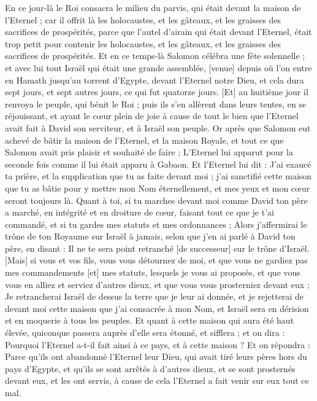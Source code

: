 \begin{multicols}{2}
En ce jour-là le Roi consacra le milieu du parvis, qui était devant la maison de l'Eternel ; car il offrit là les holocaustes, et les gâteaux, et les graisses des sacrifices de prospérités, parce que l'autel d'airain qui était devant l'Eternel, était trop petit pour contenir les holocaustes, et les gâteaux, et les graisses des sacrifices de prospérités.
Et en ce temps-là Salomon célébra une fête solennelle ; et avec lui tout Israël qui était une grande assemblée, [venue] depuis où l'on entre en Hamath jusqu'au torrent d'Egypte, devant l'Eternel notre Dieu, et cela dura sept jours, et sept autres jours, ce qui fut quatorze jours.
[Et] au huitième jour il renvoya le peuple, qui bénit le Roi ; puis ils s'en allèrent dans leurs tentes, en se réjouissant, et ayant le cœur plein de joie à cause de tout le bien que l'Eternel avait fait à David son serviteur, et à Israël son peuple.
\VerseOne{}Or après que Salomon eut achevé de bâtir la maison de l'Eternel, et la maison Royale, et tout ce que Salomon avait pris plaisir et souhaité de faire ;
L'Eternel lui apparut pour la seconde fois comme il lui était apparu à Gabaon.
Et l'Eternel lui dit : J'ai exaucé ta prière, et la supplication que tu as faite devant moi ; j'ai sanctifié cette maison que tu as bâtie pour y mettre mon Nom éternellement, et mes yeux et mon cœur seront toujours là.
Quant à toi, si tu marches devant moi comme David ton père a marché, en intégrité et en droiture de cœur, faisant tout ce que je t'ai commandé, et si tu gardes mes statuts et mes ordonnances ;
Alors j'affermirai le trône de ton Royaume sur Israël à jamais, selon que j'en ai parlé à David ton père, en disant : Il ne te sera point retranché [de successeur] sur le trône d'Israël.
[Mais] si vous et vos fils, vous vous détournez de moi, et que vous ne gardiez pas mes commandements [et] mes statuts, lesquels je vous ai proposés, et que vous vous en alliez et serviez d'autres dieux, et que vous vous prosterniez devant eux ;
Je retrancherai Israël de dessus la terre que je leur ai donnée, et je rejetterai de devant moi cette maison que j'ai consacrée à mon Nom, et Israël sera en dérision et en moquerie à tous les peuples.
Et quant à cette maison qui aura été haut élevée, quiconque passera auprès d'elle sera étonné, et sifflera ; et on dira : Pourquoi l'Eternel a-t-il fait ainsi à ce pays, et à cette maison ?
Et on répondra : Parce qu'ils ont abandonné l'Eternel leur Dieu, qui avait tiré leurs pères hors du pays d'Egypte, et qu'ils se sont arrêtés à d'autres dieux, et se sont prosternés devant eux, et les ont servis, à cause de cela l'Eternel a fait venir sur eux tout ce mal.

\end{multicols}
